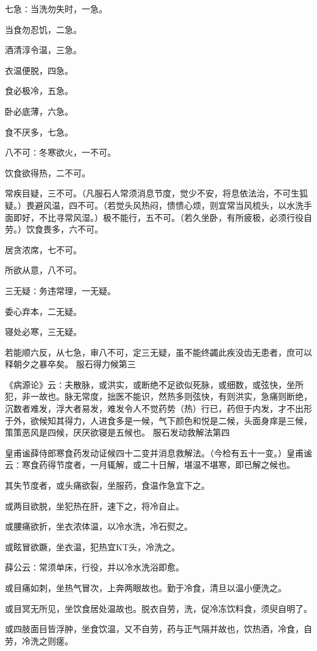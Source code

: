 \documentclass[a4paper,12pt,UTF8,twoside]{ctexbook}
\begin{document}
七急∶当洗勿失时，一急。

当食勿忍饥，二急。

酒清淳令温，三急。

衣温便脱，四急。

食必极冷，五急。

卧必底薄，六急。

食不厌多，七急。

八不可∶冬寒欲火，一不可。

饮食欲得热，二不可。

常疾目疑，三不可。（凡服石人常须消息节度，觉少不安，将息依法治，不可生狐疑。）畏避风温，四不可。（若觉头风热闷，愦愦心烦，则宜常当风梳头，以水洗手面即好，不比寻常风湿。）极不能行，五不可。（若久坐卧，有所疲极，必须行役自劳。）饮食畏多，六不可。

居贪浓席，七不可。

所欲从意，八不可。

三无疑∶务违常理，一无疑。

委心弃本，二无疑。

寝处必寒，三无疑。

若能顺六反，从七急，审八不可，定三无疑，虽不能终蠲此疾没齿无患者，庶可以释朝夕之暴卒矣。
服石得力候第三

《病源论》云∶夫散脉，或洪实，或断绝不足欲似死脉，或细数，或弦快，坐所犯，非一故也。脉无常度，拙医不能识，然热多则弦快，有则洪实，急痛则断绝，沉数者难发，浮大者易发，难发令人不觉药势（热）行已，药但于内发，才不出形于外，欲候知其得力，人进食多是一候，气下颜色和悦是二候，头面身痒是三候，策策恶风是四候，厌厌欲寝是五候也。
服石发动救解法第四

皇甫谧薛侍郎寒食药发动证候四十二变并消息救解法。（今检有五十一变。）皇甫谧云∶寒食药得节度者，一月辄解，或二十日解，堪温不堪寒，即已解之候也。

其失节度者，或头痛欲裂，坐服药，食温作急宜下之。

或两目欲脱，坐犯热在肝，速下之，将冷自止。

或腰痛欲折，坐衣浓体温，以冷水洗，冷石熨之。

或眩冒欲蹶，坐衣温，犯热宜KT头，冷洗之。

薛公云∶常须单床，行役，并以冷水洗浴即愈。

或目痛如刺，坐热气冒次，上奔两眼故也。勤于冷食，清旦以温小便洗之。

或目冥无所见，坐饮食居处温故也。脱衣自劳，洗，促冷冻饮料食，须臾自明了。

或四肢面目皆浮肿，坐食饮温，又不自劳，药与正气隔并故也，饮热酒，冷食，自劳，冷洗之则瘥。
\end{document}
